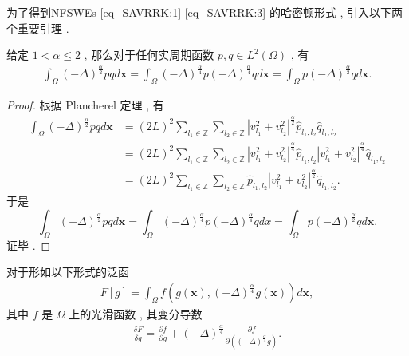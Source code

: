 为了得到NFSWEs \eqref{eq_SAVRRK:1}-\eqref{eq_SAVRRK:3} 的哈密顿形式 , 引入以下两个重要引理 . 
\begin{lemma}\label{lem_PAVF:1}
	\cite{fuStructurepreservingAlgorithmsTwodimensional2020} 
	 给定 $1<\alpha \leq 2$ , 那么对于任何实周期函数 $p , q \in L^{2}(\Omega)$ , 有
	\begin{align}\label{eq_PAVF:22}
	\int_{\Omega}(-\Delta)^{\frac{\alpha}{2}} p q d \boldsymbol{x}=\int_{\Omega}(-\Delta)^{\frac{\alpha}{4}} p(-\Delta)^{\frac{\alpha}{4}} q d \boldsymbol{x}=\int_{\Omega} p(-\Delta)^{\frac{\alpha}{2}} q d \boldsymbol{x} . 
	\end{align}
	\end{lemma}

\begin{proof}
	根据 Plancherel 定理 , 有
\begin{equation}
\begin{aligned}
\int_{\Omega}(-\Delta)^{\frac{\alpha}{2}} p q d \boldsymbol{x} &=(2 L)^{2} \sum_{l_{1} \in \mathbb{Z}} \sum_{l_{2} \in \mathbb{Z}}\left|v_{l_{1}}^{2}+v_{l_{2}}^{2}\right|^{\frac{\alpha}{2}} \hat{p}_{l_{1} , l_{2}} \hat{q}_{l_{1} , l_{2}} \\
&=(2 L)^{2} \sum_{l_{1} \in \mathbb{Z}} \sum_{l_{2} \in \mathbb{Z}}\left|v_{l_{1}}^{2}+v_{l_{2}}^{2}\right|^{\frac{\alpha}{4}} \hat{p}_{l_{1} , l_{2}}\left|v_{l_{1}}^{2}+v_{l_{2}}^{2}\right|^{\frac{\alpha}{4}} \hat{q}_{l_{1} , l_{2}} \\
&=(2 L)^{2} \sum_{l_{1} \in \mathbb{Z}} \sum_{l_{2} \in \mathbb{Z}} \hat{p}_{l_{1} , l_{2}}\left|v_{l_{1}}^{2}+v_{l_{2}}^{2}\right|^{\frac{\alpha}{2}} \hat{q}_{l_{1} , l_{2}}  . 
\end{aligned}
\label{eq_23}\end{equation}
于是
\begin{equation}
\int_{\Omega}(-\Delta)^{\frac{\alpha}{2}} p q d \boldsymbol{x}=\int_{\Omega}(-\Delta)^{\frac{\alpha}{4}} p(-\Delta)^{\frac{\alpha}{4}} q d x=\int_{\Omega} p(-\Delta)^{\frac{\alpha}{2}} q d \boldsymbol{x}.
\label{eq_24}\end{equation}
证毕 . 
\end{proof}


\begin{lemma}\label{lem_PAVF:2}
	\cite{wangStructurepreservingNumericalMethods2018} 
	 对于形如以下形式的泛函
	\begin{align}\label{eq_PAVF:25}
	F[g]=\int_{\Omega} f\left(g(\boldsymbol{x}) , (-\Delta)^{\frac{\alpha}{4}} g(\boldsymbol{x})\right) d \boldsymbol{x} , 
	\end{align}
	其中 $f$ 是 $\Omega$ 上的光滑函数 , 其变分导数
	\begin{align}\label{eq_PAVF:26}
	\frac{\delta F}{\delta g}=\frac{\partial f}{\partial g}+(-\Delta)^{\frac{\alpha}{4}} \frac{\partial f}{\partial\left((-\Delta)^{\frac{\alpha}{4}} g\right)}  . 
	\end{align}
	\end{lemma}

